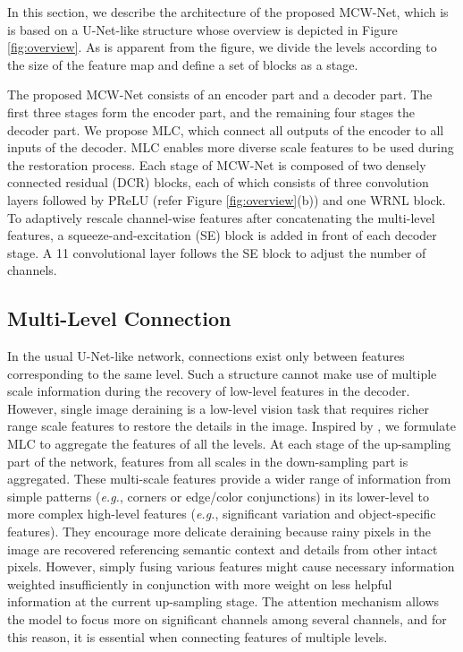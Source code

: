\documentclass[a4paper,fleqn]{cas-dc}
\begin{document}
In this section, we describe the architecture of the proposed MCW-Net, which is is based on a U-Net-like structure whose overview is depicted in Figure \ref{fig:overview}. As is apparent from the figure, we divide the levels according to the size of the feature map and define a set of blocks as a stage.

 The proposed MCW-Net consists of an encoder part and a decoder part. The first three stages form the encoder part, and the remaining four stages the decoder part. We propose MLC, which connect all outputs of the encoder to all inputs of the decoder. MLC enables more diverse scale features to be used during the restoration process. Each stage of MCW-Net is composed of two densely connected residual (DCR) blocks, each of which consists of three convolution layers followed by PReLU \cite{trottier2017parametric} (refer Figure \ref{fig:overview}(b)) and one WRNL block. To adaptively rescale channel-wise features after concatenating the multi-level features, a squeeze-and-excitation (SE) block is added in front of each decoder stage. A 11 convolutional layer follows the SE block to adjust the number of channels. 

\subsection{Multi-Level Connection}
\label{sec:multi-level connections}








In the usual U-Net-like network, connections exist only between features corresponding to the same level. Such a structure cannot make use of multiple scale information during the recovery of low-level features in the decoder. However, single image deraining is a low-level vision task that requires richer range scale features to restore the details in the image. Inspired by \cite{sun2019highresolutionposeestimation, tan2019efficientdet, wang2019highresolutionvisualrecognition}, we formulate MLC to aggregate the features of all the levels. At each stage of the up-sampling part of the network, features from all scales in the down-sampling part is aggregated. These multi-scale features provide a wider range of information from simple patterns (\textit{e.g.}, corners or edge/color conjunctions) in its lower-level to more complex high-level features (\textit{e.g.}, significant variation and object-specific features). They encourage more delicate deraining because rainy pixels in the image are recovered referencing semantic context and details from other intact pixels. However, simply fusing various features might cause 
necessary information weighted insufficiently in conjunction with more weight on less helpful information at the current up-sampling stage. The attention mechanism allows the model to focus more on significant channels among several channels, and for this reason, it is essential when connecting features of multiple levels.
\end{document}
